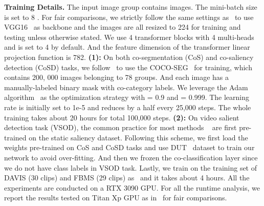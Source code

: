 \documentclass[journal]{IEEEtran}
\begin{document}
\noindent \textbf{Training Details.}
The input image group  contains  images. The mini-batch size is set to 8 .
For fair comparisons, we strictly follow the same settings as~\cite{zhang2020gradient,fan2021group}  to use VGG16~\cite{simonyan2014very} as backbone and the images are all resized to 224  for training and testing unless otherwise stated.
We use 4 transformer blocks with 4 multi-heads and  is set to 4 by default. And the feature dimension of the transformer linear projection function is 782.
\textbf{(1):} On both co-segmentation (CoS) and co-saliency detection (CoSD) tasks, we follow~\cite{wang2019robust,zhang2021summarize} to use the COCO-SEG~\cite{lin2014microsoft} for training, which contains 200, 000 images belonging to 78 groups. And each image has a manually-labeled binary mask with co-category labels. We leverage the Adam algorithm~\cite{kingma2014adam} as the optimization strategy with  = 0.9 and  = 0.999. The learning rate is initially set to 1e-5 and reduces by a half every 25,000 steps. The whole training takes about 20 hours for total 100,000 steps.
\textbf{(2):} On video salient detection task (VSOD), the common practice for most methods ~\cite{gu2020pyramid,ji2021full} are first pre-trained on the static saliency dataset. Following this scheme, we first load the weights pre-trained on CoS and CoSD tasks and use DUT~\cite{wang2017learning} dataset to train our network to avoid over-fitting. And then we frozen the co-classification layer since we do not have class labels in VSOD task. Lastly, we train on the training set of DAVIS (30 clips) and FBMS (29 clips) as~\cite{ji2021full} and it takes about 4 hours.
All the experiments are conducted on a RTX 3090 GPU.
For all the runtime analysis, we report the results tested on Titan Xp GPU as in~\cite{gu2020pyramid} for fair comparisons.









\begin{table}[t]
    \centering
		\vspace{6pt}
		\caption{Analysis of the features from different stages in the encoder.}\label{table3}
\end{table}
\end{document}
